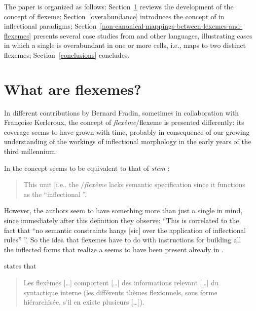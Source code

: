 \documentclass[output=paper]{langsci/langscibook}
\begin{document}
The paper is organized as follows: Section~\ref{what-are-flexemes} reviews the development of
the concept of flexeme; Section~\ref{overabundance} introduces the concept of
 in inflectional paradigms; Section~\ref{non-canonical-mappings-between-lexemes-and-flexemes} presents several case
studies from  and other languages, illustrating cases in which a
single  is overabundant in one or more cells, i.e., maps to two
distinct flexemes; Section~\ref{conclusions} concludes.

\section{What are flexemes?}\label{what-are-flexemes}

In different contributions by Bernard Fradin, sometimes in collaboration
with Françoise Kerleroux, the concept of \emph{flexème}\slash{}flexeme is
presented differently: its coverage seems to have grown with time,
probably in consequence of our growing understanding of the workings of
inflectional morphology in the early years of the third millennium.

In %
\citet[193]{Fradin03b} %
%
the concept seems to be equivalent to
that of \emph{stem} %
\citep[in the sense, e.g., of ][]{Aronoff94}%
%
:

\begin{quote}
This unit {[}i.e., the \slash{}\emph{flexème}\is{flexeme}{]} lacks semantic
specification since it functions as the ``inflectional ''.
\end{quote}

However, the authors seem to have something more than just a single 
in mind, since immediately after this definition they observe: ``This is
correlated to the fact that ``no semantic constraints hangs {[}sic{]}
over the application of inflectional rules'' %
\citep[6]{Corbin87}%
%
''. So the
idea that flexemes have to do with instructions for building all the
inflected forms that realize a  seems to have been present already
in %
\citet{Fradin03b}%
%
.

%
\citet[259]{Fradin2003} %
%
states that

\begin{quote}
Les flexèmes {[}\ldots{}{]} comportent {[}\ldots{}{]} des informations
relevant {[}\ldots{]} du syntactique interne (les différents thèmes
flexionnels, sous forme hiérarchisée, s'il en existe plusieurs
{[}\ldots{}{]}).
\end{quote}
\end{document}
